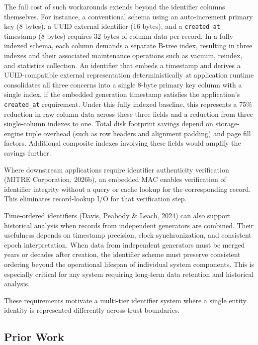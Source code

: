 \documentclass[fleqn,10pt,lineno]{wlpeerj}
\begin{document}
The full cost of such workarounds extends beyond the identifier columns
themselves. For instance, a conventional schema using an auto-increment
primary key (8 bytes), a UUID external identifier (16 bytes), and a
\texttt{created\_at} timestamp (8 bytes) requires 32 bytes of column
data per record. In a fully indexed schema, each column demands a
separate B-tree index, resulting in three indexes and their associated
maintenance operations such as vacuum, reindex, and statistics
collection. An identifier that embeds a timestamp and derives a
UUID-compatible external representation deterministically at application
runtime consolidates all three concerns into a single 8-byte primary key
column with a single index, if the embedded generation timestamp
satisfies the application's \texttt{created\_at} requirement. Under this
fully indexed baseline, this represents a 75\% reduction in raw column
data across these three fields and a reduction from three single-column
indexes to one. Total disk footprint savings depend on storage-engine
tuple overhead (such as row headers and alignment padding) and page fill
factors. Additional composite indexes involving these fields would
amplify the savings further.

Where downstream applications require identifier authenticity
verification (MITRE Corporation, 2026b), an embedded MAC enables
verification of identifier integrity without a query or cache lookup for
the corresponding record. This eliminates record-lookup I/O for that
verification step.

Time-ordered identifiers (Davis, Peabody \& Leach, 2024) can also
support historical analysis when records from independent generators are
combined. Their usefulness depends on timestamp precision, clock
synchronization, and consistent epoch interpretation. When data from
independent generators must be merged years or decades after creation,
the identifier scheme must preserve consistent ordering beyond the
operational lifespan of individual system components. This is especially
critical for any system requiring long-term data retention and
historical analysis.

These requirements motivate a multi-tier identifier system where a
single entity identity is represented differently across trust
boundaries.

\subsection{Prior Work}\label{prior-work}
\end{document}
